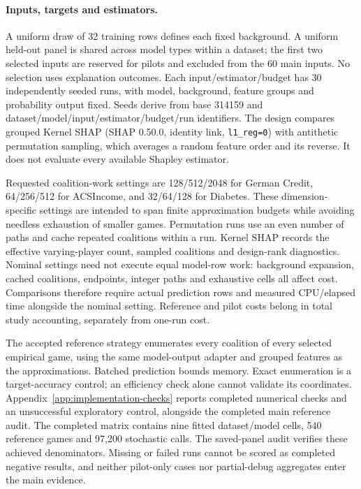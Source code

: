 \paragraph{Inputs, targets and estimators.}
A uniform draw of 32 training rows defines each fixed background. A uniform held-out panel is shared across model types within a dataset; the first two selected inputs are reserved for pilots and excluded from the 60 main inputs. No selection uses explanation outcomes. Each input/estimator/budget has 30 independently seeded runs, with model, background, feature groups and probability output fixed. Seeds derive from base 314159 and dataset/model/input/estimator/budget/run identifiers. The design compares grouped Kernel SHAP (SHAP 0.50.0, identity link, \texttt{l1\_reg=0}) with antithetic permutation sampling, which averages a random feature order and its reverse. It does not evaluate every available Shapley estimator.

Requested coalition-work settings are 128/512/2048 for German Credit, 64/256/512 for ACSIncome, and 32/64/128 for Diabetes. These dimension-specific settings are intended to span finite approximation budgets while avoiding needless exhaustion of smaller games. Permutation runs use an even number of paths and cache repeated coalitions within a run. Kernel SHAP records the effective varying-player count, sampled coalitions and design-rank diagnostics. Nominal settings need not execute equal model-row work: background expansion, cached coalitions, endpoints, integer paths and exhaustive cells all affect cost. Comparisons therefore require actual prediction rows and measured CPU/elapsed time alongside the nominal setting. Reference and pilot costs belong in total study accounting, separately from one-run cost.

The accepted reference strategy enumerates every coalition of every selected empirical game, using the same model-output adapter and grouped features as the approximations. Batched prediction bounds memory. Exact enumeration is a target-accuracy control; an efficiency check alone cannot validate its coordinates. Appendix~\ref{app:implementation-checks} reports completed numerical checks and an unsuccessful exploratory control, alongside the completed main reference audit. The completed matrix contains nine fitted dataset/model cells, 540 reference games and 97,200 stochastic calls. The saved-panel audit verifies these achieved denominators. Missing or failed runs cannot be scored as completed negative results, and neither pilot-only cases nor partial-debug aggregates enter the main evidence.

